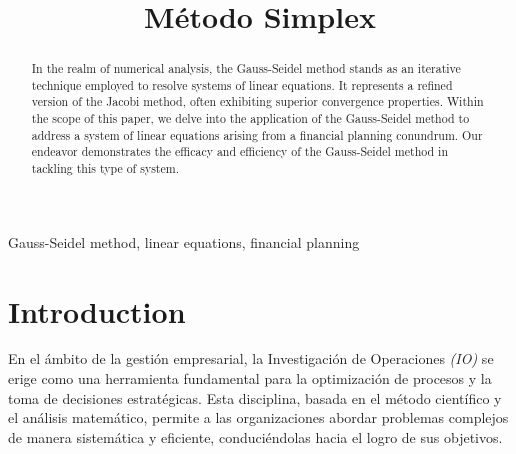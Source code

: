 \documentclass[conference]{IEEEtran}
\begin{document}
\title{Método Simplex\\}

\author{
\and
{}
\and
{}
}

\maketitle



\begin{abstract}
In the realm of numerical analysis, the Gauss-Seidel method stands as an 
iterative technique employed to resolve systems of linear equations. It 
represents a refined version of the Jacobi method, often exhibiting 
superior convergence properties. Within the scope of this paper, we delve 
into the application of the Gauss-Seidel method to address a system of 
linear equations arising from a financial planning conundrum. Our 
endeavor demonstrates the efficacy and efficiency of the Gauss-Seidel 
method in tackling this type of system.
\end{abstract}

\begin{IEEEkeywords}
Gauss-Seidel method, linear equations, financial planning
\end{IEEEkeywords}

\nocite{source_code}

\section{Introduction}
En el ámbito de la gestión empresarial, la Investigación de Operaciones 
\textit{(IO)} se erige como una herramienta fundamental para la optimización de 
procesos y la toma de decisiones estratégicas. Esta disciplina, basada 
en el método científico y el análisis matemático, permite a las 
organizaciones abordar problemas complejos de manera sistemática y 
eficiente, conduciéndolas hacia el logro de sus objetivos.
\end{document}
